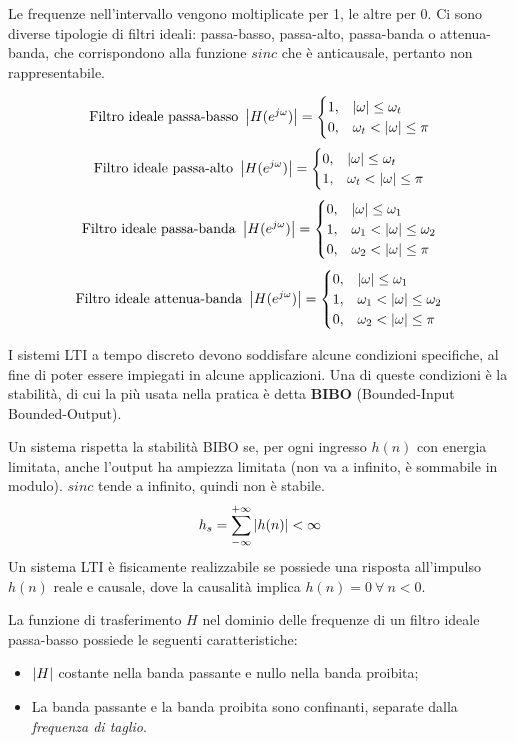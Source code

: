 Le frequenze nell'intervallo vengono moltiplicate per 1, le altre per 0. Ci sono diverse tipologie di filtri ideali: passa-basso, passa-alto, passa-banda o attenua-banda, che corrispondono alla funzione $sinc$ che è anticausale, pertanto non rappresentabile. 

$$\text{Filtro ideale passa-basso } \left|H(e^{j\omega})\right| = \begin{cases}
1, & \left|\omega\right| \leq \omega_t \\
0, & \omega_t < \left|\omega\right| \leq \pi
\end{cases}$$
$$\text{Filtro ideale passa-alto } \left|H(e^{j\omega})\right| = \begin{cases}
0, & \left|\omega\right| \leq \omega_t \\
1, & \omega_t < \left|\omega\right| \leq \pi
\end{cases}$$
$$\text{Filtro ideale passa-banda } \left|H(e^{j\omega})\right| = \begin{cases}
0, & \left|\omega\right| \leq \omega_1 \\
1, & \omega_1 < \left|\omega\right| \leq \omega_2 \\
0, & \omega_2 < \left|\omega\right| \leq \pi
\end{cases}$$
$$\text{Filtro ideale attenua-banda } \left|H(e^{j\omega})\right| = \begin{cases}
0, & \left|\omega\right| \leq \omega_1 \\
1, & \omega_1 < \left|\omega\right| \leq \omega_2 \\
0, & \omega_2 < \left|\omega\right| \leq \pi
\end{cases}$$

I sistemi LTI a tempo discreto devono soddisfare alcune condizioni specifiche, al fine di poter essere impiegati in alcune applicazioni. Una di queste condizioni è la stabilità, di cui la più usata nella pratica è detta \textbf{BIBO} (Bounded-Input Bounded-Output).

Un sistema rispetta la stabilità BIBO se, per ogni ingresso $h(n)$ con energia limitata, anche l'output ha ampiezza limitata (non va a infinito, è sommabile in modulo). $sinc$ tende a infinito, quindi non è stabile. 
$$h_s = \sum_{-\infty}^{+\infty} \left|h(n)\right| < \infty$$
Un sistema LTI è fisicamente realizzabile se possiede una risposta all'impulso $h(n)$ reale e causale, dove la causalità implica $h(n) = 0\ \forall\ n < 0$.

La funzione di trasferimento $H$ nel dominio delle frequenze di un filtro ideale passa-basso possiede le seguenti caratteristiche:
\begin{itemize}
	\item $\left|H\right|$ costante nella banda passante e nullo nella banda proibita;
	\item La banda passante e la banda proibita sono confinanti, separate dalla \textit{frequenza di taglio}.
\end{itemize}

